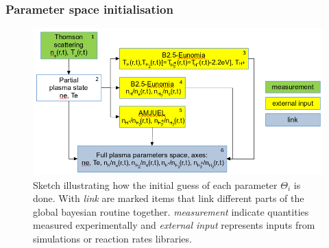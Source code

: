 \subsubsection{Parameter space initialisation}\label{Parameter space initialisation}

\begin{figure}[!ht]
	\centering
	\includegraphics[scale=0.29,trim={0 0 0 0},clip]{Chapters/chapter3/figs/bayesian_steps10.png}
	\caption{Sketch illustrating how the initial guess of each parameter $\Theta_i$ is done. With \emph{link} are marked items that link different parts of the global bayesian routine together. \emph{measurement} indicate quantities measured experimentally and \emph{external input} represents inputs from simulations or reaction rates libraries.}
	\label{fig:bayes1a}
\end{figure}


